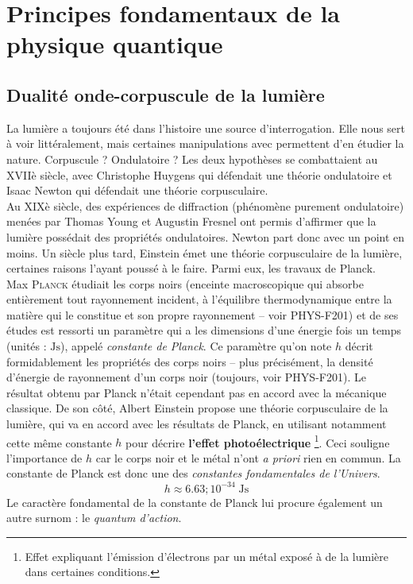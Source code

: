 \documentclass[../notesdecours]{subfiles}
\begin{document}
\chapter{Principes fondamentaux de la physique quantique}

\section{Dualité onde-corpuscule de la lumière}
La lumière a toujours été dans l'histoire une source d'interrogation. Elle nous sert à voir littéralement, mais certaines manipulations avec permettent d'en étudier la nature. Corpuscule ? Ondulatoire ? Les deux hypothèses se combattaient au XVIIè siècle, avec Christophe Huygens qui défendait une théorie ondulatoire et Isaac Newton qui défendait une théorie corpusculaire. \\

Au XIXè siècle, des expériences de diffraction (phénomène purement ondulatoire) menées par Thomas Young et Augustin Fresnel ont permis d'affirmer que la lumière possédait des propriétés ondulatoires. Newton part donc avec un point en moins. Un siècle plus tard, Einstein émet une théorie corpusculaire de la lumière, certaines raisons l'ayant poussé à le faire. Parmi eux, les travaux de Planck. \\

Max \textsc{Planck} étudiait les corps noirs (enceinte macroscopique qui absorbe entièrement tout rayonnement incident, à l'équilibre thermodynamique entre la matière qui le constitue et son propre rayonnement -- voir PHYS-F201) et de ses études est ressorti un paramètre qui a les dimensions d'une énergie fois un temps (unités : $\mathrm{Js}$), appelé \textit{constante de Planck}. Ce paramètre qu'on note $h$ décrit formidablement les propriétés des corps noirs -- plus précisément, la densité d'énergie de rayonnement d'un corps noir (toujours, voir PHYS-F201). Le résultat obtenu par Planck n'était cependant pas en accord avec la mécanique classique. De son côté, Albert Einstein propose une théorie corpusculaire de la lumière, qui va en accord avec les résultats de Planck, en utilisant notamment cette même constante $h$ pour décrire \textbf{l'effet photoélectrique} \footnote{Effet expliquant l'émission d'électrons par un métal exposé à de la lumière dans certaines conditions.}. Ceci souligne l'importance de $h$ car le corps noir et le métal n'ont \textit{a priori} rien en commun. La constante de Planck est donc une des \textit{constantes fondamentales de l'Univers}.
$$h \approx 6.63 ; 10^{-34} \; \mathrm{Js}$$
Le caractère fondamental de la constante de Planck lui procure également un autre surnom : le \textit{quantum d'action}.
\end{document}
